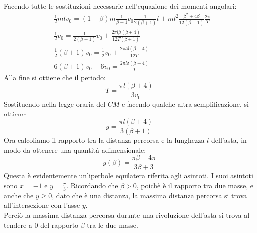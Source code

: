 \documentclass[]{article}
\begin{document}
Facendo tutte le sostituzioni necessarie nell'equazione dei momenti angolari:
\begin{align}
	&\frac{1}{2}mlv_0=(1+\beta)m\frac{1}{\beta+1}v_0\frac{1}{2(\beta+1)}l+ml^2\frac{\beta^2+4\beta}{12(\beta+1)}\frac{2\pi}{T} \\
	&\frac{1}{2}v_0=\frac{1}{2(\beta+1)}v_0+\frac{2\pi l\beta(\beta+4)}{12T(\beta+1)} \\
	&\frac{1}{2}(\beta+1)v_0=\frac{1}{2}v_0+\frac{2\pi l\beta(\beta+4)}{12T} \\
	&6(\beta+1)v_0-6v_0=\frac{2\pi l\beta(\beta+4)}{T}
\end{align}
Alla fine si ottiene che il periodo:
$$ T=\frac{\pi l(\beta+4)}{3v_0}$$
Sostituendo nella legge oraria del $CM$ e facendo qualche altra semplificazione, si ottiene:
$$y=\frac{\pi l(\beta+4)}{3(\beta+1)}$$
Ora calcoliamo il rapporto tra la distanza percorsa e la lunghezza $l$ dell'asta, in modo da ottenere una quantità adimensionale:
$$y(\beta)=\frac{\pi \beta+4\pi}{3\beta+3}$$
Questa è evidentemente un'iperbole equilatera riferita agli asintoti. I suoi asintoti sono $x=-1$ e $y=\frac{\pi}{3}$. Ricordando che $\beta>0$, poichè è il rapporto tra due masse, e anche che $y\ge0$, dato che è una distanza, la massima distanza percorsa si trova all'intersezione con l'asse $y$. 
$$\hspace{2em}$$
Perciò la massima distanza percorsa durante una rivoluzione dell'asta si trova al tendere a $0$ del rapporto $\beta$ tra le due masse.
\end{document}
